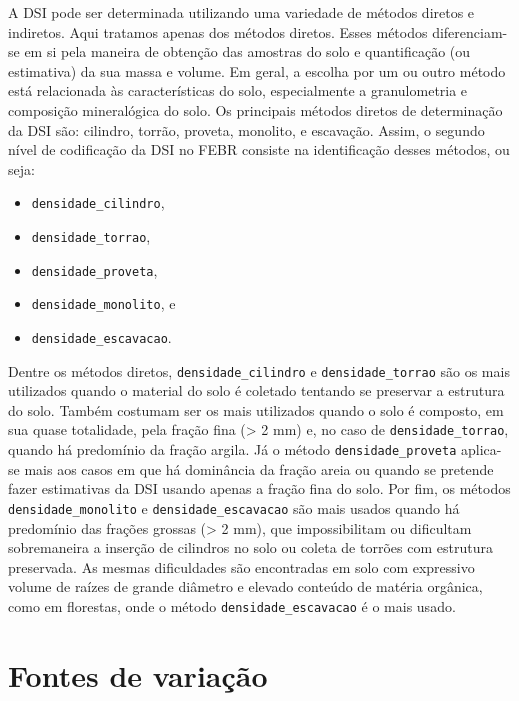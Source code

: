 \documentclass[
  a4paper,
  dvipsnames]{tufte-book}
\providecommand{\tightlist}{%
  \setlength{\itemsep}{0pt}\setlength{\parskip}{0pt}}
\begin{document}
A DSI pode ser determinada utilizando uma variedade de métodos diretos e indiretos. Aqui tratamos apenas dos métodos diretos. Esses métodos diferenciam-se em si pela maneira de obtenção das amostras do solo e quantificação (ou estimativa) da sua massa e volume. Em geral, a escolha por um ou outro método está relacionada às características do solo, especialmente a granulometria e composição mineralógica do solo. Os principais métodos diretos de determinação da DSI são: cilindro, torrão, proveta, monolito, e escavação. Assim, o segundo nível de codificação da DSI no FEBR consiste na identificação desses métodos, ou seja:

\begin{itemize}
\tightlist
\item
  \texttt{densidade\_cilindro},
\item
  \texttt{densidade\_torrao},
\item
  \texttt{densidade\_proveta},
\item
  \texttt{densidade\_monolito}, e
\item
  \texttt{densidade\_escavacao}.
\end{itemize}

Dentre os métodos diretos, \texttt{densidade\_cilindro} e \texttt{densidade\_torrao} são os mais utilizados quando o material do solo é coletado tentando se preservar a estrutura do solo. Também costumam ser os mais utilizados quando o solo é composto, em sua quase totalidade, pela fração fina (\textgreater{} 2 mm) e, no caso de \texttt{densidade\_torrao}, quando há predomínio da fração argila. Já o método \texttt{densidade\_proveta} aplica-se mais aos casos em que há dominância da fração areia ou quando se pretende fazer estimativas da DSI usando apenas a fração fina do solo. Por fim, os métodos \texttt{densidade\_monolito} e \texttt{densidade\_escavacao} são mais usados quando há predomínio das frações grossas (\textgreater{} 2 mm), que impossibilitam ou dificultam sobremaneira a inserção de cilindros no solo ou coleta de torrões com estrutura preservada. As mesmas dificuldades são encontradas em solo com expressivo volume de raízes de grande diâmetro e elevado conteúdo de matéria orgânica, como em florestas, onde o método \texttt{densidade\_escavacao} é o mais usado.

\hypertarget{fontes-de-variauxe7uxe3o-1}{%
\section{Fontes de variação}\label{fontes-de-variauxe7uxe3o-1}}
\end{document}
